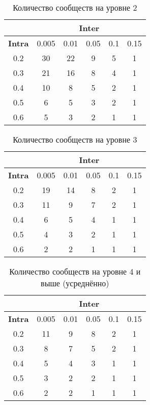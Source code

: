 \begin{table}[ht]
\centering
\caption{Количество сообществ на уровне 2}
\label{tab:level2}
\begin{tabular}{|c|c|c|c|c|c|}
\hline
\textbf{} & \multicolumn{5}{c|}{\textbf{Inter}} \\
\hline
\textbf{Intra} & 0.005 & 0.01 & 0.05 & 0.1 & 0.15 \\
\hline
0.2 & 30 & 22 & 9  & 5 & 1 \\
0.3 & 21 & 16 & 8  & 4 & 1 \\
0.4 & 10 & 8  & 5  & 2 & 1 \\
0.5 & 6  & 5  & 3  & 2 & 1 \\
0.6 & 5  & 3  & 2  & 1 & 1 \\
\hline
\end{tabular}
\end{table}

\begin{table}[ht]
\centering
\caption{Количество сообществ на уровне 3}
\label{tab:level3}
\begin{tabular}{|c|c|c|c|c|c|}
\hline
\textbf{} & \multicolumn{5}{c|}{\textbf{Inter}} \\
\hline
\textbf{Intra} & 0.005 & 0.01 & 0.05 & 0.1 & 0.15 \\
\hline
0.2 & 19 & 14 & 8 & 2 & 1 \\
0.3 & 11 & 9  & 7 & 2 & 1 \\
0.4 & 6  & 5  & 4 & 1 & 1 \\
0.5 & 4  & 3  & 2 & 1 & 1 \\
0.6 & 2  & 2  & 1 & 1 & 1 \\
\hline
\end{tabular}
\end{table}

\begin{table}[H]
\centering
\caption{Количество сообществ на уровне 4 и выше (усреднённо)}
\label{tab:level4plus}
\begin{tabular}{|c|c|c|c|c|c|}
\hline
\textbf{} & \multicolumn{5}{c|}{\textbf{Inter}} \\
\hline
\textbf{Intra} & 0.005 & 0.01 & 0.05 & 0.1 & 0.15 \\
\hline
0.2 & 11 & 9 & 8 & 2 & 1 \\
0.3 & 8  & 7 & 5 & 2 & 1 \\
0.4 & 5  & 4 & 3 & 1 & 1 \\
0.5 & 3  & 2 & 2 & 1 & 1 \\
0.6 & 2  & 2 & 1 & 1 & 1 \\
\hline
\end{tabular}
\end{table}

